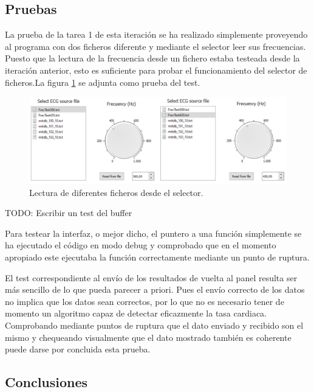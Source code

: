     \subsection{Pruebas}
        
        La prueba de la tarea 1 de esta iteración se ha realizado simplemente proveyendo al programa con dos ficheros diferente y mediante el selector leer sus frecuencias. Puesto que la lectura de la frecuencia desde un fichero estaba testeada desde la iteración anterior, esto es suficiente para probar el funcionamiento del selector de ficheros.La figura \ref{fig:fileSelectorTest} se adjunta como prueba del test.

        \begin{figure}[H]
                \centering
                        \includegraphics[width = \linewidth]{figuras/FileSelectorTest.png}
                \caption{Lectura de diferentes ficheros desde el selector.}
                \label{fig:fileSelectorTest}
        \end{figure}

        TODO: Escribir un test del buffer

        Para testear la interfaz, o mejor dicho, el puntero a una función simplemente se ha ejecutado el código en modo debug y comprobado que en el momento apropiado este ejecutaba la función correctamente mediante un punto de ruptura. 

        El test correspondiente al envío de los resultados de vuelta al panel resulta ser más sencillo de lo que pueda parecer a priori. Pues el envío correcto de los datos no implica que los datos sean correctos, por lo que no es necesario tener de momento un algoritmo capaz de detectar eficazmente la tasa cardiaca. Comprobando mediante puntos de ruptura que el dato enviado y recibido son el mismo y chequeando visualmente que el dato mostrado también es coherente puede darse por concluida esta prueba.

        
    \subsection{Conclusiones}
    
